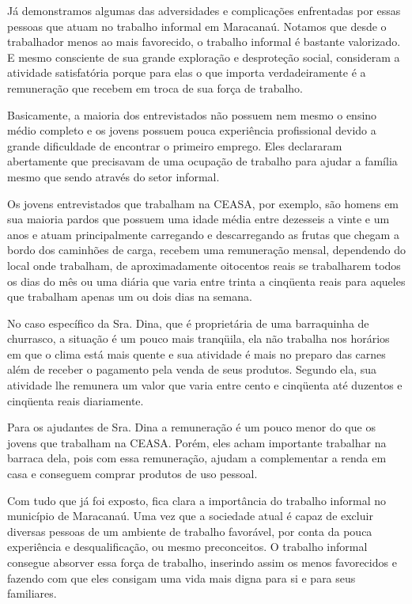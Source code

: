 Já demonstramos algumas das adversidades e complicações enfrentadas por essas pessoas que atuam no trabalho informal em Maracanaú. Notamos que desde o trabalhador menos ao mais favorecido, o trabalho informal é bastante valorizado. E mesmo consciente de sua grande exploração e desproteção social, consideram a atividade satisfatória porque para elas o que importa verdadeiramente é a remuneração que recebem em troca de sua força de trabalho.

 Basicamente, a maioria dos entrevistados não possuem nem mesmo o ensino médio completo e os jovens possuem pouca experiência profissional devido a grande dificuldade de encontrar o primeiro emprego. Eles declararam abertamente que precisavam de uma ocupação de trabalho para ajudar a família mesmo que sendo através do setor informal.
 
 Os jovens entrevistados que trabalham na CEASA, por exemplo, são homens em sua maioria pardos que possuem uma idade média entre dezesseis a vinte e um anos e atuam principalmente carregando e descarregando as frutas que chegam a bordo dos caminhões de carga, recebem uma remuneração mensal, dependendo do local onde trabalham, de aproximadamente oitocentos reais se trabalharem todos os dias do mês ou uma diária que varia entre trinta a cinqüenta reais para aqueles que trabalham apenas um ou dois dias na semana. 
 
No caso específico da Sra. Dina, que é proprietária de uma barraquinha de churrasco, a situação é um pouco mais tranqüila, ela não trabalha nos horários em que o clima está mais quente e sua atividade é mais no preparo das carnes além de receber o pagamento pela venda de seus produtos. Segundo ela, sua atividade lhe remunera um valor que varia entre cento e cinqüenta até duzentos e cinqüenta reais diariamente.

Para os ajudantes de Sra. Dina a remuneração é um pouco menor do que os jovens que trabalham na CEASA. Porém, eles acham importante trabalhar na barraca dela, pois com essa remuneração, ajudam a complementar a renda em casa e conseguem comprar produtos de uso pessoal.

Com tudo que já foi exposto, fica clara a importância do trabalho informal no município de Maracanaú. Uma vez que a sociedade atual é capaz de excluir diversas pessoas de um ambiente de trabalho favorável, por conta da pouca experiência e desqualificação, ou mesmo preconceitos. O trabalho informal consegue absorver essa força de trabalho, inserindo assim os menos favorecidos e fazendo com que eles consigam uma vida mais digna para si e para seus familiares.  
